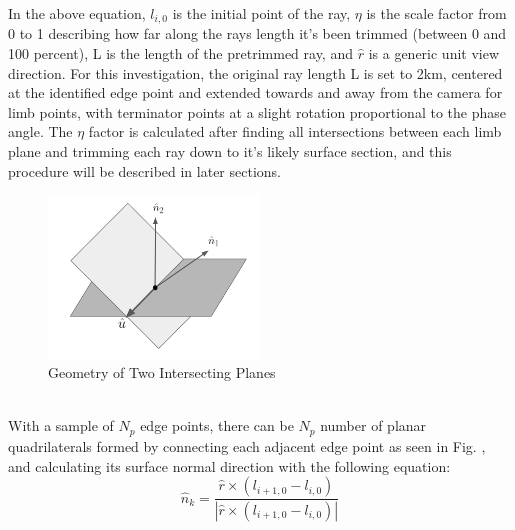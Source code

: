 In the above equation, $l_{i,0}$ is the initial point of the ray, $\eta$ is the scale factor from 0 to 1 describing how far along the rays length it's been trimmed (between 0 and 100 percent), L is the length of the pretrimmed ray, and $\hat{r}$ is a generic unit view direction. For this investigation, the original ray length L is set to 2km, centered at the identified edge point and extended towards and away from the camera for limb points, with terminator points at a slight rotation proportional to the phase angle. The $\eta$ factor is calculated after finding all intersections between each limb plane and trimming each ray down to it's likely surface section, and this procedure will be described in later sections.
\begin{figure}
    \centering
    \vspace{-10pt}
    \captionsetup{justification=centering}
    \includegraphics[width = 0.5\textwidth]{fig/planes_intersect.png}
    \caption{Geometry of Two Intersecting Planes}
    \label{fig:two_intersect}
\end{figure}
\\With a sample of $N_p$ edge points, there can be $N_p$ number of planar quadrilaterals formed by connecting each adjacent edge point as seen in Fig. 
, and calculating its surface normal direction with the following equation:
\begin{equation}
\hat{n}_k = \frac{\hat{r} \times (l_{i+1,0} - l_{i,0})}{|\hat{r} \times (l_{i+1,0} - l_{i,0})|}
\end{equation}



